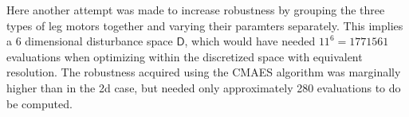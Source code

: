     Here another attempt was made to increase robustness by grouping the three types of leg motors together and varying their paramters separately. This implies a 6 dimensional disturbance space $\mathsf{D}$, which would have needed $11^6=1771561$ evaluations when optimizing within the discretized space with equivalent resolution. The robustness acquired using the CMAES algorithm was marginally higher than in the 2d case, but needed only approximately 280 evaluations to do be computed.  




































